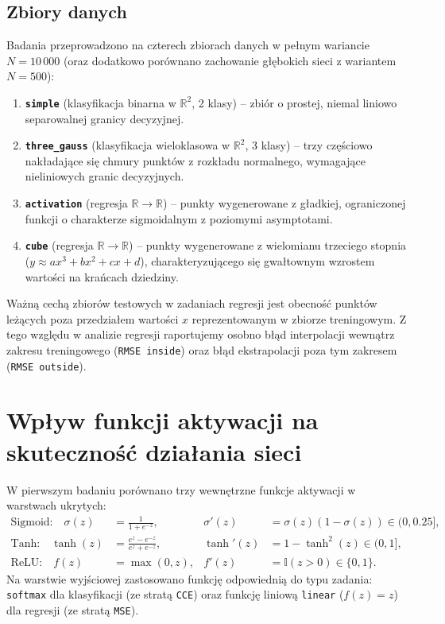 \documentclass{article}
\begin{document}
\subsection{Zbiory danych}
Badania przeprowadzono na czterech zbiorach danych w pełnym wariancie $N = 10\,000$ (oraz dodatkowo porównano zachowanie głębokich sieci z wariantem $N = 500$):
\begin{enumerate}
    \item \textbf{\texttt{simple}} (klasyfikacja binarna w $\mathbb{R}^2$, 2 klasy) -- zbiór o prostej, niemal liniowo separowalnej granicy decyzyjnej.
    \item \textbf{\texttt{three\_gauss}} (klasyfikacja wieloklasowa w $\mathbb{R}^2$, 3 klasy) -- trzy częściowo nakładające się chmury punktów z rozkładu normalnego, wymagające nieliniowych granic decyzyjnych.
    \item \textbf{\texttt{activation}} (regresja $\mathbb{R} \to \mathbb{R}$) -- punkty wygenerowane z gładkiej, ograniczonej funkcji o charakterze sigmoidalnym z poziomymi asymptotami.
    \item \textbf{\texttt{cube}} (regresja $\mathbb{R} \to \mathbb{R}$) -- punkty wygenerowane z wielomianu trzeciego stopnia ($y \approx ax^3 + bx^2 + cx + d$), charakteryzującego się gwałtownym wzrostem wartości na krańcach dziedziny.
\end{enumerate}
Ważną cechą zbiorów testowych w zadaniach regresji jest obecność punktów leżących poza przedziałem wartości $x$ reprezentowanym w zbiorze treningowym. Z tego względu w analizie regresji raportujemy osobno błąd interpolacji wewnątrz zakresu treningowego (\texttt{RMSE inside}) oraz błąd ekstrapolacji poza tym zakresem (\texttt{RMSE outside}).

\newpage

\section{Wpływ funkcji aktywacji na skuteczność działania sieci}

W pierwszym badaniu porównano trzy wewnętrzne funkcje aktywacji w warstwach ukrytych:
\begin{align}
    \text{Sigmoid:} \quad \sigma(z) &= \frac{1}{1 + e^{-z}}, & \sigma'(z) &= \sigma(z)(1 - \sigma(z)) \in (0, 0.25], \\
    \text{Tanh:} \quad \tanh(z) &= \frac{e^z - e^{-z}}{e^z + e^{-z}}, & \tanh'(z) &= 1 - \tanh^2(z) \in (0, 1], \\
    \text{ReLU:} \quad f(z) &= \max(0, z), & f'(z) &= \mathbb{I}(z > 0) \in \{0, 1\}.
\end{align}
Na warstwie wyjściowej zastosowano funkcję odpowiednią do typu zadania: \texttt{softmax} dla klasyfikacji (ze stratą \texttt{CCE}) oraz funkcję liniową \texttt{linear} ($f(z)=z$) dla regresji (ze stratą \texttt{MSE}).
\end{document}
